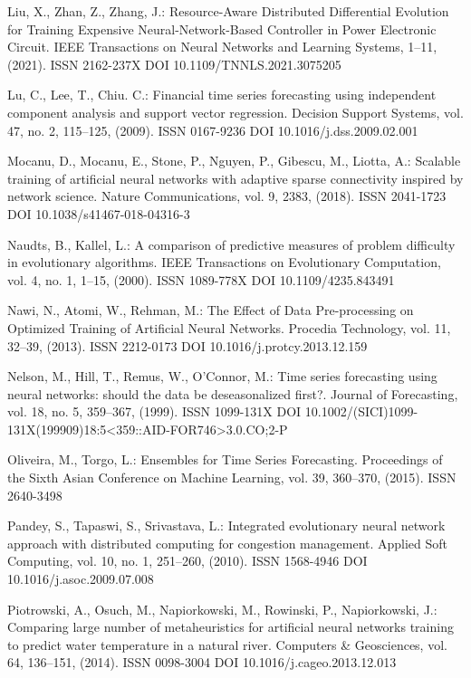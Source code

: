 \begin{thebibliography}{99.}
 Liu, X., Zhan, Z., Zhang, J.: Resource-Aware Distributed Differential Evolution for Training Expensive Neural-Network-Based Controller in Power Electronic Circuit. IEEE Transactions on Neural Networks and Learning Systems, 1--11, (2021). ISSN 2162-237X DOI 10.1109/TNNLS.2021.3075205

 Lu, C., Lee, T., Chiu. C.: Financial time series forecasting using independent component analysis and support vector regression. Decision Support Systems, vol. 47, no. 2, 115--125, (2009). ISSN 0167-9236 DOI 10.1016/j.dss.2009.02.001

 Mocanu, D., Mocanu, E., Stone, P., Nguyen, P., Gibescu, M., Liotta, A.: Scalable training of artificial neural networks with adaptive sparse connectivity inspired by network science. Nature Communications, vol. 9, 2383, (2018). ISSN 2041-1723 DOI 10.1038/s41467-018-04316-3

 Naudts, B., Kallel, L.: A comparison of predictive measures of problem difficulty in evolutionary algorithms. IEEE Transactions on Evolutionary Computation, vol. 4, no. 1, 1--15, (2000). ISSN 1089-778X DOI 10.1109/4235.843491

 Nawi, N., Atomi, W., Rehman, M.: The Effect of Data Pre-processing on Optimized Training of Artificial Neural Networks. Procedia Technology, vol. 11, 32--39, (2013). ISSN 2212-0173 DOI 10.1016/j.protcy.2013.12.159

 Nelson, M., Hill, T., Remus, W., O'Connor, M.: Time series forecasting using neural networks: should the data be deseasonalized first?. Journal of Forecasting, vol. 18, no. 5, 359--367, (1999). ISSN 1099-131X DOI 10.1002/(SICI)1099-131X(199909)18:5<359::AID-FOR746>3.0.CO;2-P

 Oliveira, M., Torgo, L.: Ensembles for Time Series Forecasting. Proceedings of the Sixth Asian Conference on Machine Learning, vol. 39, 360--370, (2015). ISSN 2640-3498

 Pandey, S., Tapaswi, S., Srivastava, L.: Integrated evolutionary neural network approach with distributed computing for congestion management. Applied Soft Computing, vol. 10, no. 1, 251--260, (2010). ISSN 1568-4946 DOI 10.1016/j.asoc.2009.07.008

 Piotrowski, A., Osuch, M., Napiorkowski, M., Rowinski, P., Napiorkowski, J.: Comparing large number of metaheuristics for artificial neural networks training to predict water temperature in a natural river. Computers \& Geosciences, vol. 64, 136--151, (2014). ISSN 0098-3004 DOI 10.1016/j.cageo.2013.12.013


\end{thebibliography}
